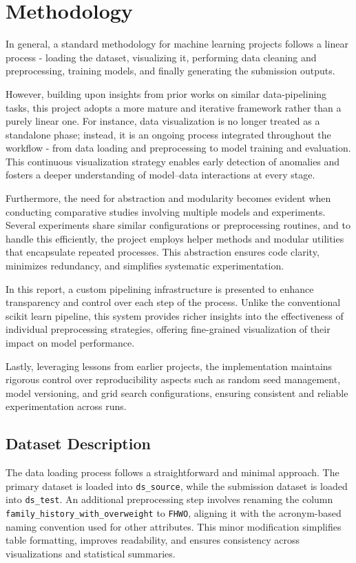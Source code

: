 \chapter{Methodology}\label{ch:methodology}


In general, a standard methodology for machine learning projects follows a linear process - loading the dataset, visualizing it, performing data cleaning and preprocessing, training models, and finally generating the submission outputs.

However, building upon insights from prior works on similar data-pipelining tasks, this project adopts a more mature and iterative framework rather than a purely linear one.
For instance, data visualization is no longer treated as a standalone phase; instead, it is an ongoing process integrated throughout the workflow - from data loading and preprocessing to model training and evaluation.
This continuous visualization strategy enables early detection of anomalies and fosters a deeper understanding of model–data interactions at every stage.

Furthermore, the need for abstraction and modularity becomes evident when conducting comparative studies involving multiple models and experiments.
Several experiments share similar configurations or preprocessing routines, and to handle this efficiently, the project employs helper methods and modular utilities that encapsulate repeated processes.
This abstraction ensures code clarity, minimizes redundancy, and simplifies systematic experimentation.

In this report, a custom pipelining infrastructure is presented to enhance transparency and control over each step of the process.
Unlike the conventional scikit learn pipeline, this system provides richer insights into the effectiveness of individual preprocessing strategies, offering fine-grained visualization of their impact on model performance.

Lastly, leveraging lessons from earlier projects, the implementation maintains rigorous control over reproducibility aspects such as random seed management, model versioning, and grid search configurations, ensuring consistent and reliable experimentation across runs.



\section{Dataset Description}\label{sec:dataset-description}
The data loading process follows a straightforward and minimal approach.  
The primary dataset is loaded into \texttt{ds\_source}, while the submission dataset is loaded into \texttt{ds\_test}.  
An additional preprocessing step involves renaming the column \texttt{family\_history\_with\_overweight} to \texttt{FHWO}, aligning it with the acronym-based naming convention used for other attributes.  
This minor modification simplifies table formatting, improves readability, and ensures consistency across visualizations and statistical summaries.


